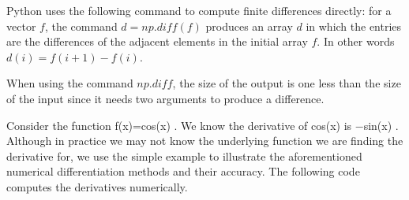 %
%


Python uses the following command to compute finite differences directly: for a vector $f$, the command $d=np.diff(f)$ produces an array $d$ in which the entries are the differences of the adjacent elements in the initial array $f$. In other words $d(i)=f(i+1)-f(i)$.



When using the command $np.diff$, the size of the output is one less than the size of the input since it needs two arguments to produce a difference.


\begin{example}
Consider the function f(x)=cos(x)
. We know the derivative of cos(x)
 is −sin(x)
. Although in practice we may not know the underlying function we are finding the derivative for, we use the simple example to illustrate the aforementioned numerical differentiation methods and their accuracy. The following code computes the derivatives numerically.
\end{example}

